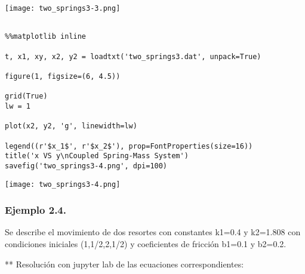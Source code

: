 \documentclass{article} %
\begin{document}
\begin{center}
 	\texttt{[image: two\_springs3-3.png]}
 \end{center}



\begin{verbatim} 

%%matplotlib inline

t, x1, xy, x2, y2 = loadtxt('two_springs3.dat', unpack=True)

figure(1, figsize=(6, 4.5))

grid(True)
lw = 1

plot(x2, y2, 'g', linewidth=lw)

legend((r'$x_1$', r'$x_2$'), prop=FontProperties(size=16))
title('x VS y\nCoupled Spring-Mass System')
savefig('two_springs3-4.png', dpi=100)

\end{verbatim}



\begin{center}
 	\texttt{[image: two\_springs3-4.png]}
 \end{center}


\subsubsection{Ejemplo 2.4.}
Se describe el movimiento de dos resortes con constantes k1=0.4 y k2=1.808 con condiciones iniciales (1,1/2,2,1/2) y coeficientes de fricción b1=0.1 y b2=0.2.

\vspace{0.5 cm}

** Resolución con jupyter lab de las ecuaciones correspondientes:
\end{document}
